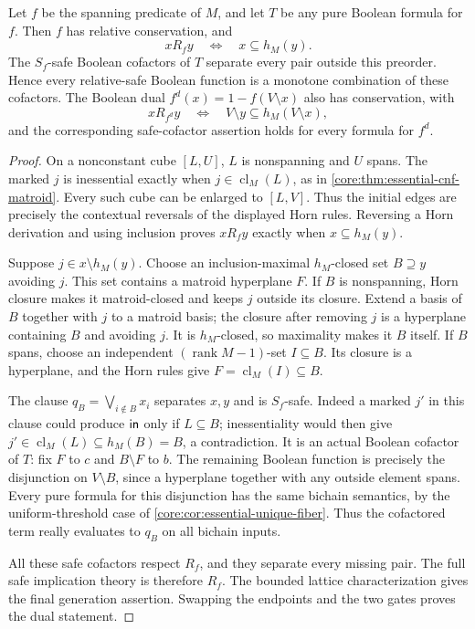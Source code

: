 \begin{theorem}
\label{core:thm:matroid-safe-prunings}
Let $f$ be the spanning predicate of $M$, and let $T$ be any pure Boolean
formula for $f$. Then $f$ has relative conservation, and
\[
 xR_fy\quad\Longleftrightarrow\quad x\subseteq h_M(y).
\]
The $S_f$-safe Boolean cofactors of $T$ separate every pair outside this
preorder. Hence every relative-safe Boolean function is a monotone
combination of these cofactors. The Boolean dual
$f^d(x)=1-f(V\setminus x)$ also has conservation,
with
\[
 xR_{f^d}y\quad\Longleftrightarrow\quad
 V\setminus y\subseteq h_M(V\setminus x),
\]
and the corresponding safe-cofactor assertion holds for every formula for $f^d$.
\end{theorem}
\begin{proof}
On a nonconstant cube $[L,U]$, $L$ is nonspanning and $U$ spans.
The marked $j$ is inessential exactly when
$j\in\operatorname{cl}_M(L)$, as in
\cref{core:thm:essential-cnf-matroid}. Every such cube can be enlarged to
$[L,V]$. Thus the initial edges are precisely the contextual reversals
of the displayed Horn rules. Reversing a Horn derivation and using
inclusion proves $xR_fy$ exactly when $x\subseteq h_M(y)$.

Suppose $j\in x\setminus h_M(y)$. Choose an inclusion-maximal
$h_M$-closed set $B\supseteq y$ avoiding $j$. This set contains a
matroid hyperplane $F$. If $B$ is nonspanning, Horn closure makes it
matroid-closed and keeps $j$ outside its closure. Extend a basis of $B$
together with $j$ to a matroid basis; the closure after removing $j$
is a hyperplane containing $B$ and avoiding $j$. It is $h_M$-closed,
so maximality makes it $B$ itself. If $B$ spans, choose an independent
$(\operatorname{rank}M-1)$-set $I\subseteq B$. Its closure is a
hyperplane, and the Horn rules give
$F=\operatorname{cl}_M(I)\subseteq B$.

The clause $q_B=\bigvee_{i\notin B}x_i$ separates $x,y$ and is $S_f$-safe.
Indeed a marked $j'$ in this clause could produce $\mathsf{in}$ only if
$L\subseteq B$; inessentiality would then give
$j'\in\operatorname{cl}_M(L)\subseteq h_M(B)=B$, a contradiction.
It is an actual Boolean cofactor of $T$: fix $F$ to $c$ and
$B\setminus F$ to $b$. The remaining Boolean function is precisely
the disjunction on $V\setminus B$, since a hyperplane together with
any outside element spans. Every pure formula for this disjunction has
the same bichain semantics, by the uniform-threshold case of
\cref{core:cor:essential-unique-fiber}. Thus the cofactored term really
evaluates to $q_B$ on all bichain inputs.

All these safe cofactors respect $R_f$, and they separate every missing
pair. The full safe implication theory is therefore $R_f$. The bounded
lattice characterization gives the final generation assertion.
Swapping the endpoints and the two gates proves the dual statement.
\end{proof}

